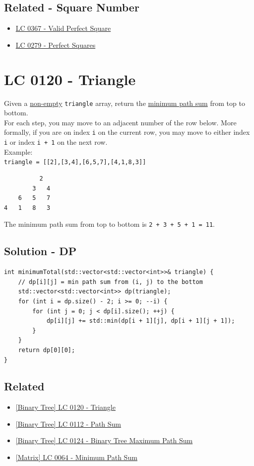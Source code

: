\subsection*{Related - Square Number}
\begin{itemize}
\item \hyperref[lc0367]{LC 0367 - Valid Perfect Square}
\item \hyperref[lc0279]{LC 0279 - Perfect Squares}
\end{itemize}

\section{LC 0120 - Triangle}\label{lc0120}
Given a \ul{non-empty} {\colorbox{CodeBackground}{\lstinline|triangle|}} array, return the \ul{minimum path sum} from top to bottom.\\

For each step, you may move to an adjacent number of the row below. More formally, if you are on index {\colorbox{CodeBackground}{\lstinline|i|}} on the current row, you may move to either index {\colorbox{CodeBackground}{\lstinline|i|}} or index {\colorbox{CodeBackground}{\lstinline|i + 1|}} on the next row.\\

Example: \\
{\colorbox{CodeBackground}{\lstinline|triangle = [[2],[3,4],[6,5,7],[4,1,8,3]]|}}
\begin{lstlisting}
		  2
		3   4
	6   5   7
4   1   8   3
\end{lstlisting}
The minimum path sum from top to bottom is {\colorbox{CodeBackground}{\lstinline|2 + 3 + 5 + 1 = 11|}}.

\subsection*{Solution - DP}
\begin{lstlisting}
int minimumTotal(std::vector<std::vector<int>>& triangle) {
	// dp[i][j] = min path sum from (i, j) to the bottom
	std::vector<std::vector<int>> dp(triangle);
	for (int i = dp.size() - 2; i >= 0; --i) {
		for (int j = 0; j < dp[i].size(); ++j) { 
			dp[i][j] += std::min(dp[i + 1][j], dp[i + 1][j + 1]);
		}
	}
	return dp[0][0];
}
\end{lstlisting}

\subsection*{Related}
\begin{itemize}
	\item \hyperref[lc0120]{[Binary Tree] LC 0120 - Triangle}
	\item \hyperref[lc0112]{[Binary Tree] LC 0112 - Path Sum}
	\item \hyperref[lc0124]{[Binary Tree] LC 0124 - Binary Tree Maximum Path Sum}
	\item \hyperref[lc0064]{[Matrix] LC 0064 - Minimum Path Sum}
\end{itemize}

